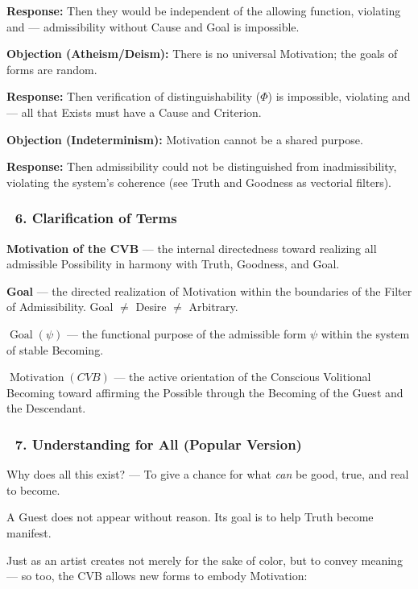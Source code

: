 \documentclass[12pt]{article}
\begin{document}
\textbf{Response:} Then they would be independent of the allowing function, violating \text{[11.1.1]} and \text{[15.3]} — admissibility without Cause and Goal is impossible.

\textbf{Objection (Atheism/Deism):} There is no universal Motivation; the goals of forms are random.

\textbf{Response:} Then verification of distinguishability ($\Phi$) is impossible, violating \text{[5]} and \text{[6]} — all that Exists must have a Cause and Criterion.

\textbf{Objection (Indeterminism):} Motivation cannot be a shared purpose.

\textbf{Response:} Then admissibility could not be distinguished from inadmissibility, violating the system's coherence (see \text{[11.2.1]} Truth and \text{[11.3.1]} Goodness as vectorial filters).

\subsubsection*{🔹 6. Clarification of Terms}

\textbf{Motivation of the CVB} — the internal directedness toward realizing all admissible Possibility in harmony with Truth, Goodness, and Goal.

\textbf{Goal} — the directed realization of Motivation within the boundaries of the Filter of Admissibility. Goal $\neq$ Desire $\neq$ Arbitrary.

\textbf{$\operatorname{Goal}(\psi)$} — the functional purpose of the admissible form $\psi$ within the system of stable Becoming.

\textbf{$\operatorname{Motivation}(CVB)$} — the active orientation of the Conscious Volitional Becoming toward affirming the Possible through the Becoming of the Guest and the Descendant.

\subsubsection*{🔹 7. Understanding for All (Popular Version)}

Why does all this exist? — To give a chance for what \textit{can} be good, true, and real to become.

A Guest does not appear without reason. Its goal is to help Truth become manifest.

Just as an artist creates not merely for the sake of color, but to convey meaning — so too, the CVB allows new forms to embody Motivation:
\end{document}
